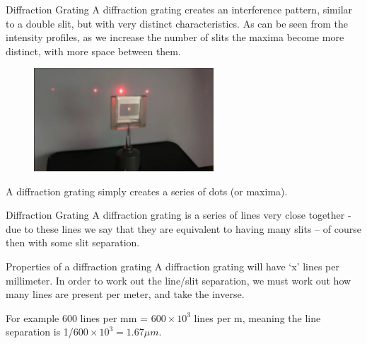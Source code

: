 \documentclass[../Main.tex]{subfiles}
\begin{document}
\begin{frame}{Diffraction Grating}
    A diffraction grating creates an interference pattern, similar to a double slit, but with very distinct characteristics. As can be seen from the intensity profiles, as we increase the number of slits the maxima become more distinct, with more space between them. 
    \begin{figure}
        \centering
        \includegraphics[width=0.6\textwidth]{Waves_Images/diffractiongrating.jpg}
    \end{figure}
    A diffraction grating simply creates a series of dots (or maxima).
\end{frame}

\begin{frame}{Diffraction Grating}
    A diffraction grating is a series of lines very close together - due to these lines we say that they are equivalent to having many slits -- of course then with some slit separation. 
    \begin{block}{Properties of a diffraction grating}
        A diffraction grating will have `x' lines per millimeter. In order to work out the line/slit separation, we must work out how many lines are present per meter, and take the inverse. 
    \end{block}
    \begin{exampleblock}{For example}
            600 lines per mm = $600\times 10^3$ lines per m, meaning the line separation is 1/$600\times 10^3 = 1.67\mu m$.
    \end{exampleblock}
\end{frame}
\end{document}
